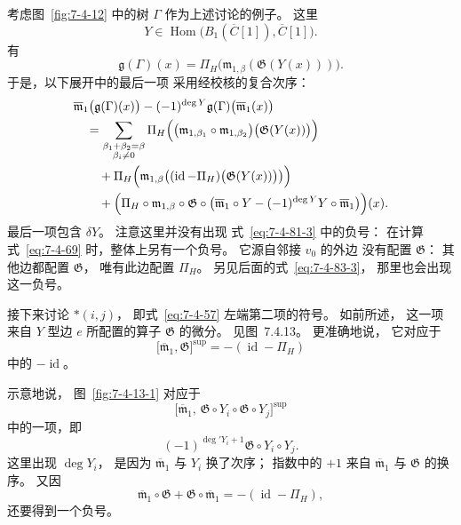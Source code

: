 
考虑图~\ref{fig:7-4-12}
中的树 $\Gamma$
作为上述讨论的例子。
这里
\[
Y\in
\operatorname{Hom}\bigl(
B_1(\overline C[1]),\overline C[1]
\bigr).
\]
有
\[
\mathfrak g(\Gamma)(x)
=\Pi_H\bigl(
\mathfrak m_{1,\beta}(
\mathfrak G(Y(x)))
\bigr).
\]
于是，以下展开中的最后一项
采用经校核的复合次序：
\[
\begin{aligned}
&\overline{\mathfrak m}_1
\bigl(\mathfrak g(\Gamma)(x)\bigr)
-(-1)^{\deg Y}
\mathfrak g(\Gamma)
\bigl(\overline{\mathfrak m}_1(x)\bigr)\\
&\quad=
\sum_{\substack{
\beta_1+\beta_2=\beta\\
\beta_i\ne0
}}
\Pi_H\Bigl(
\bigl(
\mathfrak m_{1,\beta_1}\circ
\mathfrak m_{1,\beta_2}
\bigr)
\bigl(\mathfrak G(Y(x))\bigr)
\Bigr)\\
&\qquad+
\Pi_H\Bigl(
\mathfrak m_{1,\beta}
\bigl(
(\operatorname{id}-\Pi_H)
\bigl(\mathfrak G(Y(x))\bigr)
\bigr)
\Bigr)\\
&\qquad+
\Bigl(
\Pi_H\circ
\mathfrak m_{1,\beta}\circ
\mathfrak G\circ
\bigl(
\overline{\mathfrak m}_1\circ Y
-(-1)^{\deg Y}
Y\circ\overline{\mathfrak m}_1
\bigr)
\Bigr)(x).
\end{aligned}
\]
最后一项包含 $\delta Y$。
注意这里并没有出现
式~\eqref{eq:7-4-81-3}
中的负号：
在计算式~\eqref{eq:7-4-69}
时，整体上另有一个负号。
它源自邻接 $v_0$ 的外边
没有配置 $\mathfrak G$：
其他边都配置
$\mathfrak G$，
唯有此边配置 $\Pi_H$。
另见后面的式~\eqref{eq:7-4-83-3}，
那里也会出现这一负号。

接下来讨论 $*(i,j)$，
即式~\eqref{eq:7-4-57}
左端第二项的符号。
如前所述，
这一项来自 $Y$ 型边 $e$
所配置的算子
$\mathfrak G$ 的微分。
见图~7.4.13。
更准确地说，
它对应于
\[
\bigl[
\overline{\mathfrak m}_1,
\mathfrak G
\bigr]^{\mathrm{sup}}
=-(\operatorname{id}-\Pi_H)
\]
中的
$-\operatorname{id}$。


示意地说，
图~\ref{fig:7-4-13-1}
对应于
\[
\bigl[
\overline{\mathfrak m}_1,\,
\mathfrak G\circ Y_i\circ
\mathfrak G\circ Y_j
\bigr]^{\mathrm{sup}}
\]
中的一项，即
\begin{equation}
(-1)^{\deg'Y_i+1}
\mathfrak G\circ Y_i\circ Y_j.
\tag{7.4.82.1}\label{eq:7-4-82-1}
\end{equation}
这里出现
$\deg Y_i$，
是因为
$\overline{\mathfrak m}_1$
与 $Y_i$ 换了次序；
指数中的 $+1$
来自
$\overline{\mathfrak m}_1$
与 $\mathfrak G$
的换序。
又因
\[
\overline{\mathfrak m}_1\circ\mathfrak G
+\mathfrak G\circ\overline{\mathfrak m}_1
=-(\operatorname{id}-\Pi_H),
\]
还要得到一个负号。

